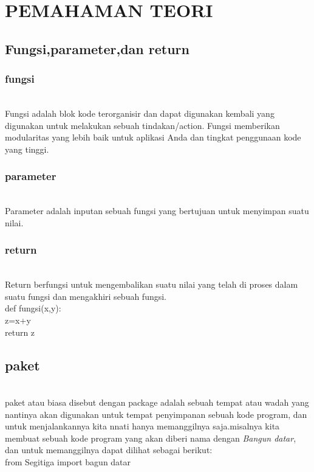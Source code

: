 \chapter{PEMAHAMAN TEORI}
\section{Fungsi,parameter,dan return}
	\subsection*{fungsi}\\
			Fungsi adalah blok kode terorganisir dan dapat digunakan kembali yang digunakan untuk melakukan sebuah tindakan/action. Fungsi memberikan modularitas yang lebih baik untuk aplikasi Anda dan tingkat penggunaan kode yang tinggi.
			
    \subsection*{parameter}\\
			Parameter adalah inputan sebuah fungsi yang bertujuan untuk menyimpan suatu nilai.
			
	\subsection*{return}\\
			Return berfungsi untuk mengembalikan suatu nilai yang telah di proses dalam suatu fungsi dan mengakhiri sebuah fungsi.\\
		
			        def fungsi(x,y):\\
					z=x+y\\
					return z\\
		
			
	\section{paket}\\
		    paket atau biasa disebut dengan package adalah sebuah tempat atau wadah yang nantinya akan digunakan untuk tempat penyimpanan sebuah kode program, dan untuk menjalankannya kita nnati hanya memanggilnya saja.misalnya kita membuat sebuah kode program yang akan diberi nama dengan \textit{Bangun datar}, dan untuk memanggilnya dapat dilihat sebagai berikut:\\
			
			from Segitiga import bagun datar
			
